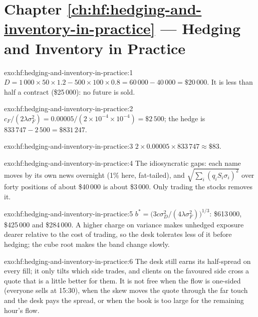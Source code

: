 \section*{Chapter \ref{ch:hf:hedging-and-inventory-in-practice} --- Hedging and Inventory in Practice}

\begin{solution}{exo:hf:hedging-and-inventory-in-practice:1}
$D=1\,000\times50\times1.2-500\times100\times0.8=60\,000-40\,000=\$20\,000$. It is less than half a contract (\$25\,000): no future is sold.
\end{solution}

\begin{solution}{exo:hf:hedging-and-inventory-in-practice:2}
$c_F/(2\lambda\sigma_F^2)=0.00005/(2\times10^{-4}\times10^{-4})=\$2\,500$; the hedge is $833\,747-2\,500=\$831\,247$.
\end{solution}

\begin{solution}{exo:hf:hedging-and-inventory-in-practice:3}
$2\times0.00005\times833\,747\approx\$83$.
\end{solution}

\begin{solution}{exo:hf:hedging-and-inventory-in-practice:4}
The idiosyncratic gaps: each name moves by its own news overnight (1\% here, fat-tailed), and $\sqrt{\sum_i(q_iS_i\sigma_i)^2}$ over forty positions
of about \$40\,000 is about \$3\,000. Only trading the stocks removes it.
\end{solution}

\begin{solution}{exo:hf:hedging-and-inventory-in-practice:5}
$b^\ast=\bigl(3c\sigma_D^2/(4\lambda\sigma_F^2)\bigr)^{1/3}$: \$613\,000, \$425\,000 and \$284\,000. A higher charge on variance makes unhedged exposure
dearer relative to the cost of trading, so the desk tolerates less of it before hedging; the cube root makes the band change slowly.
\end{solution}

\begin{solution}{exo:hf:hedging-and-inventory-in-practice:6}
The desk still earns its half-spread on every fill; it only tilts which side trades, and clients on the favoured side cross a quote that is a little
better for them. It is not free when the flow is one-sided (everyone sells at 15:30), when the skew moves the quote through the far touch and the
desk pays the spread, or when the book is too large for the remaining hour's flow.
\end{solution}

